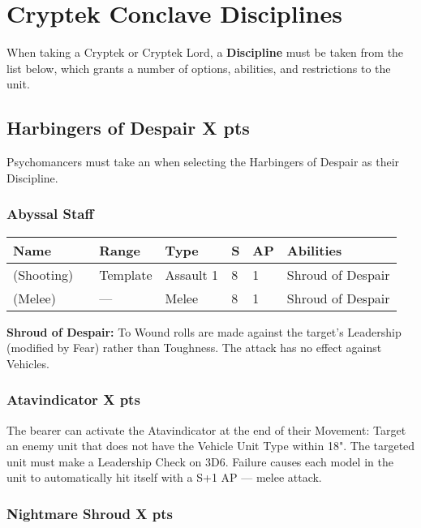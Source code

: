 \section{Cryptek Conclave Disciplines} \label{Cryptek Conclave Discipline}

When taking a Cryptek or Cryptek Lord, a \textbf{Discipline} must be taken from the list below, which grants a number of options, abilities, and restrictions to the unit.

\subsection[Harbingers of Despair ]{Harbingers of Despair  \hrulefill X pts}

Psychomancers must take an  when selecting the Harbingers of Despair as their Discipline.

\subsubsection{Abyssal Staff}
\label{Abyssal Staff}
\noindent
\begin{tabular}{||m{130pt} m{10pt} m{31pt} m{55pt} m{12pt} m{12pt} m{210pt}||}
	\hline
	Name & & Range & Type & S & AP & Abilities \\
	\hline
	\quickref{Abyssal Staff} (Shooting) & & Template & Assault 1 & 8 & 1 & Shroud of Despair \\
	\quickref{Abyssal Staff} (Melee) & & — & Melee & 8 & 1 & Shroud of Despair \\
	\hline
\end{tabular}

\textbf{Shroud of Despair:} To Wound rolls are made against the target's Leadership (modified by Fear) rather than Toughness. The attack has no effect against Vehicles.

\subsubsection[Atavindicator ]{Atavindicator  \hrulefill X pts}

The bearer can activate the Atavindicator at the end of their Movement: Target an enemy unit that does not have the Vehicle Unit Type within 18". The targeted unit must make a Leadership Check on 3D6. Failure causes each model in the unit to automatically hit itself with a S+1 AP — melee attack.

\subsubsection[Nightmare Shroud ]{Nightmare Shroud  \hrulefill X pts} 

